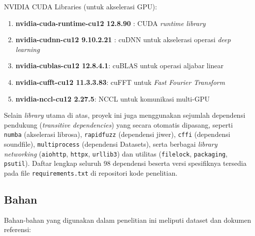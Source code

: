 \vspace{0.3cm}
\noindent
NVIDIA CUDA Libraries (untuk akselerasi GPU):
\begin{enumerate}[noitemsep]
    \item \textbf{nvidia-cuda-runtime-cu12 12.8.90} \cite{nvidia2023cuda}: CUDA \textit{runtime library}
    \item \textbf{nvidia-cudnn-cu12 9.10.2.21} \cite{chetlur2014cudnn}: cuDNN untuk akselerasi operasi \textit{deep learning}
    \item \textbf{nvidia-cublas-cu12 12.8.4.1}: cuBLAS untuk operasi aljabar linear
    \item \textbf{nvidia-cufft-cu12 11.3.3.83}: cuFFT untuk \textit{Fast Fourier Transform}
    \item \textbf{nvidia-nccl-cu12 2.27.5}: NCCL untuk komunikasi multi-GPU
\end{enumerate}

\vspace{0.2cm}
\noindent
Selain \textit{library} utama di atas, proyek ini juga menggunakan sejumlah dependensi pendukung (\textit{transitive dependencies}) yang secara otomatis dipasang, seperti \texttt{numba} (akselerasi librosa), \texttt{rapidfuzz} (dependensi jiwer), \texttt{cffi} (dependensi soundfile), \texttt{multiprocess} (dependensi Datasets), serta berbagai \textit{library} \textit{networking} (\texttt{aiohttp}, \texttt{httpx}, \texttt{urllib3}) dan utilitas (\texttt{filelock}, \texttt{packaging}, \texttt{psutil}). Daftar lengkap seluruh 98 dependensi beserta versi spesifiknya tersedia pada file \texttt{requirements.txt} di repositori kode penelitian.

\subsection{Bahan}
\label{III.Bahan}

Bahan-bahan yang digunakan dalam penelitian ini meliputi dataset dan dokumen referensi:

